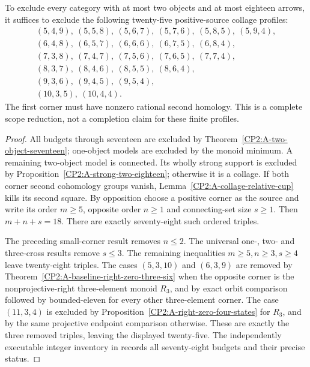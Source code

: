\begin{proposition}
\label{CP2:A-two-object-eighteen-scope}
To exclude every category with at most two objects and at
most eighteen arrows, it suffices to exclude the following
twenty-five positive-source collage profiles:
\[
\begin{gathered}
 (5,4,9),\ (5,5,8),\ (5,6,7),\ (5,7,6),\ (5,8,5),\ (5,9,4),\\
 (6,4,8),\ (6,5,7),\ (6,6,6),\ (6,7,5),\ (6,8,4),\\
 (7,3,8),\ (7,4,7),\ (7,5,6),\ (7,6,5),\ (7,7,4),\\
 (8,3,7),\ (8,4,6),\ (8,5,5),\ (8,6,4),\\
 (9,3,6),\ (9,4,5),\ (9,5,4),\\
 (10,3,5),\ (10,4,4).
\end{gathered}
\]
The first corner must have nonzero rational second homology.
This is a complete scope reduction, not a completion claim
for these finite profiles.
\end{proposition}
\begin{proof}
All budgets through seventeen are excluded by
Theorem~\ref{CP2:A-two-object-seventeen}; one-object models
are excluded by the monoid minimum. A remaining two-object
model is connected. Its wholly strong support is excluded
by Proposition~\ref{CP2:A-strong-two-eighteen}; otherwise it
is a collage. If both corner second cohomology groups vanish,
Lemma~\ref{CP2:A-collage-relative-cup} kills its second square.
By opposition choose a positive corner as the source and
write its order $m\geq5$, opposite order $n\geq1$ and
connecting-set size $s\geq1$. Then $m+n+s=18$.
There are exactly seventy-eight such ordered triples.

The preceding small-corner result removes $n\leq2$.
The universal one-, two- and three-cross results remove
$s\leq3$. The remaining inequalities $m\geq5,n\geq3,s\geq4$
leave twenty-eight triples. The cases $(5,3,10)$ and
$(6,3,9)$ are removed by
Theorem~\ref{CP2:A-baseline-right-zero-three-six} when the
opposite corner is the nonprojective-right three-element
monoid $R_3$, and by exact orbit comparison followed by
bounded-eleven for every other three-element corner.
The case $(11,3,4)$ is excluded by
Proposition~\ref{CP2:A-right-zero-four-states} for $R_3$,
and by the same projective endpoint comparison otherwise.
These are exactly the three removed triples, leaving the
displayed twenty-five. The independently executable integer
inventory in 
records all seventy-eight budgets and their precise status.
\end{proof}

